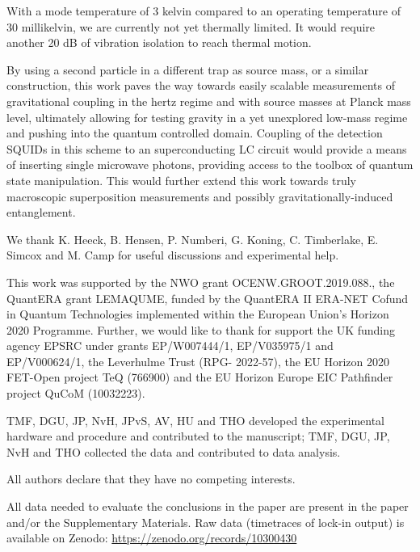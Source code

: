 \documentclass[pdflatex,sn-mathphys]{sn-jnl}
\begin{document}
    With a mode temperature of 3 kelvin compared to an operating temperature of 30 millikelvin, we are currently not yet thermally limited.
    It would require another 20 dB of vibration isolation to reach thermal motion.
    
    By using a second particle in a different trap as source mass, or a similar construction, this work paves the way towards easily scalable measurements of gravitational coupling in the hertz regime and with source masses at Planck mass level, ultimately allowing for testing gravity in a yet unexplored low-mass regime and pushing into the quantum controlled domain. Coupling of the detection SQUIDs in this scheme to an superconducting LC circuit would provide a means of inserting single microwave photons, providing access to the toolbox of quantum state manipulation. This would further extend this work towards truly macroscopic superposition measurements and possibly gravitationally-induced entanglement.
    



\backmatter

%

We thank K. Heeck, B. Hensen, P. Numberi, G. Koning, C. Timberlake, E. Simcox and M. Camp for useful discussions and experimental help.

This work was supported by the NWO grant OCENW.GROOT.2019.088., the QuantERA grant LEMAQUME, funded by the QuantERA
II ERA-NET Cofund in Quantum Technologies implemented within the European Union’s Horizon
2020 Programme. Further, we would like to thank for support the UK funding agency EPSRC
under grants EP/W007444/1, EP/V035975/1 and EP/V000624/1, the Leverhulme Trust (RPG-
2022-57), the EU Horizon 2020 FET-Open project TeQ (766900) and the EU Horizon Europe EIC Pathfinder project
QuCoM (10032223).

TMF, DGU, JP, NvH, JPvS, AV, HU and THO developed the experimental hardware and procedure and contributed to the manuscript; TMF, DGU, JP, NvH and THO collected the data and contributed to data analysis.

All authors declare that they have no competing interests.

All data needed to evaluate the conclusions in the paper are present in the paper and/or the Supplementary Materials. Raw data (timetraces of lock-in output) is available on Zenodo: \url{https://zenodo.org/records/10300430}
\end{document}
